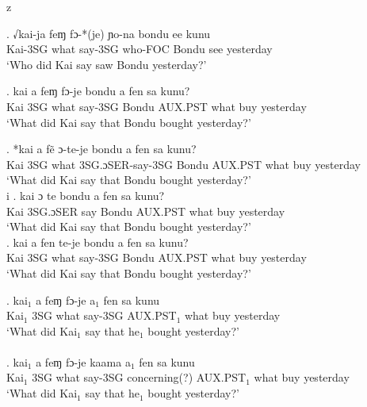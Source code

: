 z   \documentclass{assets/fieldnotes}
\begin{document}
\exg. √kai-ja feɱ fɔ-*(je) ɲo-na bondu ee kunu   \\
Kai-3SG what say-3SG who-FOC Bondu see yesterday\\
`Who did Kai say saw Bondu yesterday?'\\ 


\exg. kai a feɱ fɔ-je bondu a fen sa kunu?\\
Kai 3SG what say-3SG Bondu AUX.PST what buy yesterday\\
`What did Kai say that Bondu bought yesterday?' \\ 


\exg. *kai a fẽ ɔ-te-je bondu a fen sa kunu?\\
Kai 3SG what 3SG.ɔSER-say-3SG Bondu AUX.PST what buy yesterday\\
`What did Kai say that Bondu bought yesterday?' \\ 
i
\exg. kai ɔ te bondu a fen sa kunu?\\
Kai 3SG.ɔSER say Bondu AUX.PST what buy yesterday\\
`What did Kai say that Bondu bought yesterday?' \\

\exg. kai a fen te-je bondu a fen sa kunu?\\
Kai 3SG what say-3SG Bondu AUX.PST what buy yesterday\\
`What did Kai say that Bondu bought yesterday?'  \\ 



\exg. kai$_{1}$ a feɱ fɔ-je a$_{1}$ fen sa kunu \\
Kai$_{1}$ 3SG what say-3SG AUX.PST$_{1}$ what buy yesterday\\
`What did Kai$_{1}$ say that he$_{1}$ bought yesterday?' \\

\\

\exg. kai$_{1}$ a feɱ fɔ-je kaama a$_{1}$ fen sa kunu \\
Kai$_{1}$ 3SG what say-3SG concerning(?) AUX.PST$_{1}$ what buy yesterday\\
`What did Kai$_{1}$ say that he$_{1}$ bought yesterday?' \\
\end{document}
